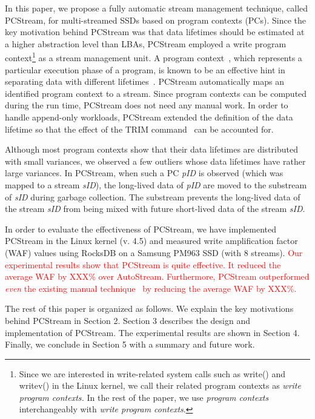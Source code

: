 In this paper, we propose a fully automatic stream management technique, called {\sf PCStream}, 
for multi-streamed SSDs based on program contexts (PCs).
Since the key motivation behind {\sf PCStream} was 
that data lifetimes should be estimated at a higher abstraction level than LBAs, 
{\sf PCStream} employed a write program context\footnote{Since we are interested in write-related 
system calls such as write() and writev() in the Linux kernel, 
we call their related program contexts as 
{\it write program contexts.} In the rest of the paper, we use 
{\it program contexts} interchangeably with {\it write program contexts}.}  
as a stream management unit.
A program context~\cite{PC}, which represents a particular execution phase of a program, 
is known to be an effective hint in separating data with different lifetimes~\cite{PCHa}.  
{\sf PCStream} automatically maps an identified program context to a stream.  
Since program contexts can be computed during the run time, 
{\sf PCStream} does not need any manual work.   
In order to handle append-only workloads, 
{\sf PCStream} extended the definition of the data lifetime 
so that the effect of the TRIM command~\cite{10} can be accounted for. 

Although most program contexts show that their data lifetimes are 
distributed with small variances, we observed a few outliers 
whose data lifetimes have rather large variances.
In {\sf PCStream}, 
when such a PC {\it pID} is observed (which was mapped to a stream {\it sID}), 
the long-lived data of {\it pID} are moved to the substream of {\it sID}
during garbage collection.  
The substream prevents the long-lived data of the stream {\it sID} 
from being mixed with future short-lived data of the stream {\it sID}.

In order to evaluate the effectiveness of PCStream, we have implemented PCStream 
in the Linux kernel (v. 4.5) and measured write amplification factor (WAF) values 
using RocksDB on a Samsung PM963 SSD (with 8 streams).  
\textcolor{red}{Our experimental results show that {\sf PCStream} is quite effective.  
It reduced the average WAF by XXX\% over AutoStream.  
Furthermore, PCStream outperformed {\it even} the existing manual technique~\cite{MultiStream} 
by reducing the average WAF by XXX\%.}

The rest of this paper is organized as follows. 
We explain the key motivations behind {\sf PCStream} in Section 2. 
Section 3 describes 
the design and implementation of {\sf PCStream}.
The experimental results are shown in Section 4. 
Finally, we conclude in Section 5 with a summary and future work. 

